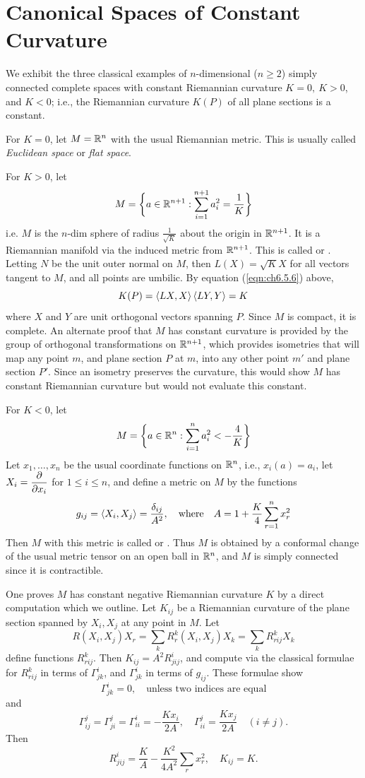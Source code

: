 \documentclass[../main]{subfiles}
\begin{document}
\section{Canonical Spaces of Constant Curvature}\label{ch06:s7}

We exhibit the three classical examples of $n$-dimensional ($n\ge2$) simply connected complete spaces with constant Riemannian curvature $K=0,~K>0$, and $K<0$; i.e., the Riemannian curvature $K(P)$ of all plane sections is a constant.

For $K=0$, let $M=\mathbb{R}^n$ with the usual Riemannian metric. This is usually called \emph{Euclidean space} or \emph{flat space}.

For $K>0$, let
\[M = \bigg\{a\in\mathbb{R}^{n+1}: \sum_{i=1}^{n+1} a_i^2 = \frac1K\bigg\}\]
i.e. $M$ is the $n$-dim sphere of radius $\frac{1}{\sqrt K}$ about the origin in $\mathbb{R}^{n+1}$. It is a Riemannian manifold via the induced metric from $\mathbb{R}^{n+1}$. This is called  or . Letting $N$ be the unit outer normal on $M$, then $L(X)=\sqrt KX$ for all vectors tangent to $M$, and all points are umbilic. By equation (\ref{eqn:ch6.5.6}) above,
\[K(P) = \left\langle LX,X\right\rangle\left\langle LY,Y\right\rangle = K\]
where $X$ and $Y$ are unit orthogonal vectors spanning $P$. Since $M$ is compact, it is complete. An alternate proof that $M$ has constant curvature is provided by the group of orthogonal transformations on $\mathbb{R}^{n+1}$, which provides isometries that will map any point $m$, and plane section $P$ at $m$, into any other point $m'$ and plane section $P'$. Since an isometry preserves the curvature, this would show $M$ has constant Riemannian curvature but would not evaluate this constant.

For $K<0$, let
\[M = \bigg\{a\in\mathbb{R}^{n}: \sum_{i=1}^{n} a_i^2 < -\frac4K\bigg\}\]
Let $x_1,\ldots,x_n$ be the usual coordinate functions on $\mathbb{R}^n$, i.e., $x_i(a)=a_i$, let $X_i=\dfrac{\partial }{\partial x_i}$ for $1\le i\le n$, and define a metric on $M$ by the functions
\[g_{ij} = \left\langle X_i,X_j\right\rangle = \frac{\delta_{ij}}{A^2},
\quad \text{where}
\quad A = 1+\frac K4\sum_{r=1}^n x_r^2\]
Then $M$ with this metric is called  or . Thus $M$ is obtained by a conformal change of the usual metric tensor on an open ball in $\mathbb{R}^n$, and $M$ is simply connected since it is contractible.

One proves $M$ has constant negative Riemannian curvature $K$ by a direct computation which we outline. Let $K_{ij}$ be a Riemannian curvature of the plane section spanned by $X_i,X_j$ at any point in $M$. Let
\[R(X_i,X_j)X_r = \sum_k R_r^k(X_i,X_j)X_k = \sum_k R_{rij}^kX_k\]
define functions $R_{rij}^k$. Then $K_{ij}=A^2R_{jij}^i$, and compute via the classical formulae for $R_{rij}^k$ in terms of $\Gamma_{jk}^i$, and $\Gamma_{jk}^i$ in terms of $g_{ij}$. These formulae show
\[\Gamma_{jk}^i=0,
\quad \text{unless two indices are equal}\]
and
\[\Gamma_{ij}^j = \Gamma_{ji}^j = \Gamma_{ii}^i = -\frac{Kx_i}{2A},
\quad \Gamma_{ii}^j=\frac{Kx_j}{2A}\quad(i\ne j).\]
Then
\[R_{jij}^i = \frac KA - \frac{K^2}{4A^2}\sum_rx_r^2,
\quad K_{ij} = K.\]
\end{document}
